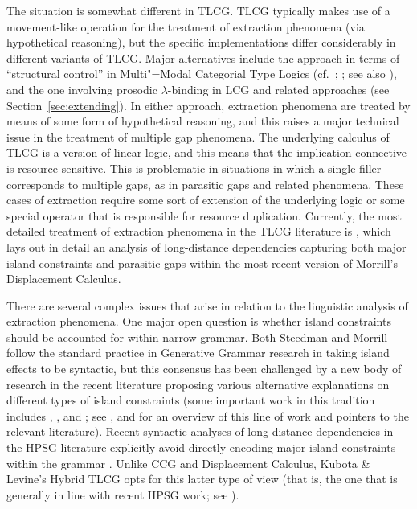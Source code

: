 \documentclass[output=paper,biblatex,babelshorthands,newtxmath,draftmode,colorlinks,citecolor=brown]{langscibook}
\begin{document}
The situation is somewhat different in TLCG. TLCG typically makes use
of a movement-like operation for the treatment of extraction
phenomena (via hypothetical reasoning), but the specific implementations differ considerably in
different variants of TLCG. Major alternatives include the approach in
terms of   ``structural control'' in Multi"=Modal Categorial Type
Logics (cf.~\citealt[Chapter~1]{BernardiPhD}; \citealt[Section~2.4]{Moortgat2011a-u};
see also \citealt[Chapter~7]{Morrill94a-u}), and the one involving prosodic
$\lambda$-binding in LCG and related approaches (see
Section~\ref{sec:extending}). In either approach, extraction phenomena
are treated by means of some form of hypothetical reasoning, and this
raises a major technical issue in the treatment of multiple gap
phenomena. The underlying calculus of TLCG is a version of linear
logic, and this means that the implication connective is resource
sensitive. This is problematic in situations in which a single filler
corresponds to multiple gaps, as in parasitic gaps and related
phenomena. These cases of extraction require some sort of extension of
the underlying logic or some special operator that is responsible for
resource duplication. Currently, the most detailed treatment of
extraction phenomena in the TLCG literature is \citet{morrilllp},
which lays out in detail an analysis of long-distance dependencies
capturing both major island constraints and parasitic gaps within the
most recent version of Morrill's Displacement Calculus.

There are several complex issues that arise in relation to the
linguistic analysis of extraction phenomena. One major open question
is whether island constraints should be accounted for within narrow
grammar. Both Steedman and Morrill follow the standard practice in
Generative Grammar research in taking island effects to be syntactic,
but this consensus has been challenged by a new body of research in
the recent literature proposing various alternative explanations on
different types of island constraints (some important work in this
tradition includes , ,
 and ; see
,  and
 for an overview of this line of work and pointers
to the relevant literature). Recent syntactic analyses of
long-distance dependencies in the HPSG literature explicitly avoid
directly encoding major island constraints within the grammar
\citep{Sag2010b,chaves12b}. Unlike CCG and Displacement Calculus,
Kubota \& Levine's Hybrid TLCG opts for this latter type of view (that
is, the one that is generally in line with recent HPSG work; see
\citealt[Chapter~10]{KubotaLevineBook}).
\end{document}
